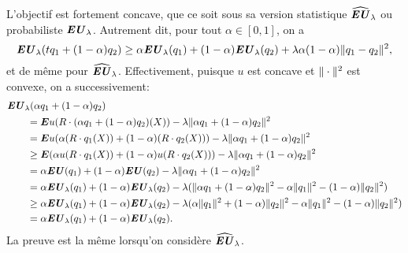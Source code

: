 \begin{lemme}
  L'objectif est fortement concave, que ce soit sous sa version statistique $\widehat{\textbf{\textit{EU}}}_\lambda$ ou
  probabiliste $\textbf{\textit{EU}}_\lambda$. Autrement dit, pour tout $\alpha \in [0,1]$, on a
  \begin{equation}
    \textbf{\textit{EU}}_\lambda(tq_1 + (1-\alpha )q_2) \geq \alpha \textbf{\textit{EU}}_\lambda(q_1) + (1-\alpha)\textbf{\textit{EU}}_\lambda(q_2) + \lambda \alpha(1-\alpha)\|q_1-q_2\|^2,
  \end{equation}
  et de même pour $\widehat{\textbf{\textit{EU}}}_\lambda$. Effectivement, puisque $u$ est concave et $\|\cdot\|^2$ est
  convexe, on a successivement:
  \begin{align}
    & \textbf{\textit{EU}}_\lambda(\alpha q_1 + (1-\alpha )q_2)\\
    &\qquad= \bm E u(R\cdot (\alpha q_1+(1-\alpha )q_2)(X)) - \lambda\|\alpha q_1 + (1-\alpha)q_2\|^2\\
    &\qquad= \bm E u(\alpha (R\cdot q_1(X)) + (1-\alpha )(R\cdot q_2(X)))- \lambda\|\alpha q_1 + (1-\alpha)q_2\|^2\\
    &\qquad\geq \bm E(\alpha  u(R\cdot q_1(X)) + (1-\alpha )u(R\cdot q_2(X))) - \lambda\|\alpha q_1 + (1-\alpha)q_2\|^2\\
    &\qquad= \alpha\textbf{\textit{EU}}(q_1) + (1-\alpha)\textbf{\textit{EU}}(q_2) - \lambda\|\alpha q_1 + (1-\alpha)q_2\|^2\\
    &\qquad= \alpha\textbf{\textit{EU}}_\lambda(q_1) + (1-\alpha)\textbf{\textit{EU}}_\lambda(q_2) - \lambda(\|\alpha q_1+(1-\alpha)q_2\|^2 - \alpha\|q_1\|^2 -
      (1-\alpha)\|q_2\|^2)\\
    &\qquad \geq \alpha\textbf{\textit{EU}}_\lambda(q_1) + (1-\alpha)\textbf{\textit{EU}}_\lambda(q_2) -\lambda(\alpha\|q_1\|^2 + (1-\alpha)\|q_2\|^2 - \alpha\|q_1\|^2 -
      (1-\alpha)\|q_2\|^2)\\
    &\qquad = \alpha\textbf{\textit{EU}}_\lambda(q_1) + (1-\alpha)\textbf{\textit{EU}}_\lambda(q_2).
  \end{align}
  La preuve est la même lorsqu'on considère $\widehat{\textbf{\textit{EU}}}_\lambda$.
\end{lemme}



